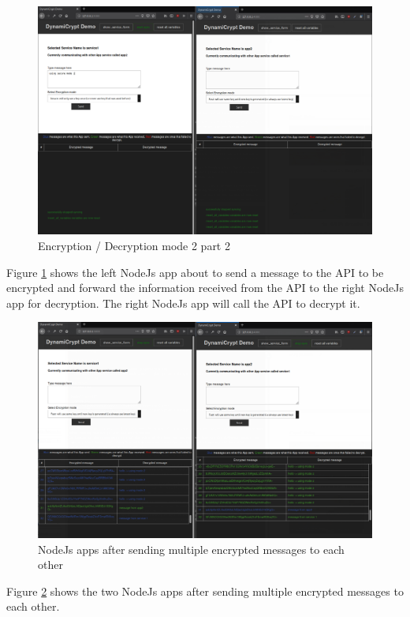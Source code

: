 \begin{figure}[!h]
  \centering
      \includegraphics[width=1\textwidth]{Figures/proto6-final.png}
  \caption[Encryption / Decryption mode 2 part 2]{Encryption / Decryption mode 2 part 2}
  \label{fig:proto6-final}
\end{figure}
\FloatBarrier
Figure \ref{fig:proto6-final} shows the left NodeJs app about to send a message to the API to be encrypted and forward the information received from the API to the right NodeJs app for decryption. The right NodeJs app will call the API to decrypt it.

\begin{figure}[!h]
  \centering
      \includegraphics[width=1\textwidth]{Figures/proto1-final.png}
  \caption[NodeJs apps after sending multiple encrypted messages to each other]{NodeJs apps after sending multiple encrypted messages to each other}
  \label{fig:proto1-final}
\end{figure}
\FloatBarrier

Figure \ref{fig:proto1-final} shows the two NodeJs apps after sending multiple encrypted messages to each other.
